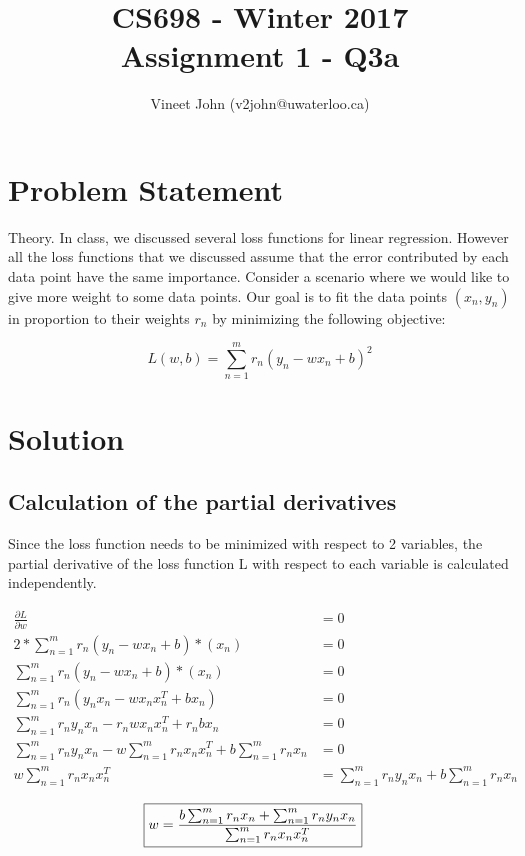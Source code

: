 \documentclass[a4paper]{article}
\title{CS698 - Winter 2017\\Assignment 1 - Q3a}
\author{Vineet John (v2john@uwaterloo.ca)}
\date{}
\begin{document}
\maketitle

\section{Problem Statement}

Theory. In class, we discussed several loss functions for linear regression. However all the loss functions that we discussed assume that the error contributed by each data point have the same importance. Consider a scenario where we would like to give more weight to some data points. Our goal is to fit the data points $(x_n , y_n )$ in proportion to their weights $r_n$ by minimizing the following objective:

$$L(w, b) = \sum_{n=1}^m r_n (y_n − wx_n + b)^2$$

\section{Solution}

\subsection{Calculation of the partial derivatives}

Since the loss function needs to be minimized with respect to 2 variables, the partial derivative of the loss function L with respect to each variable is calculated independently.

\begin{align*}
	\frac{\partial L}{\partial w} &= 0\\
	2 * \sum_{n=1}^m r_n (y_n − wx_n + b) * (x_n) &= 0\\
	\sum_{n=1}^m r_n (y_n − wx_n + b) * (x_n) &= 0\\
	\sum_{n=1}^m r_n (y_nx_n − wx_nx_n^T + bx_n) &= 0\\
	\sum_{n=1}^m r_n y_n x_n − r_n w x_n x_n^T + r_n b x_n &= 0\\
	\sum_{n=1}^m r_n y_n x_n − w \sum_{n=1}^m r_n x_n x_n^T + b \sum_{n=1}^m r_n x_n &= 0\\
	w \sum_{n=1}^m r_n x_n x_n^T &=  \sum_{n=1}^m r_n y_n x_n + b \sum_{n=1}^m r_n x_n
\end{align*}

\begin{align}
\label{pd_w}
	\Aboxed{w  = \frac{b \sum_{n=1}^m r_n x_n + \sum_{n=1}^m r_n y_n x_n} {\sum_{n=1}^m r_n x_n x_n^T}}
\end{align}
\end{document}
